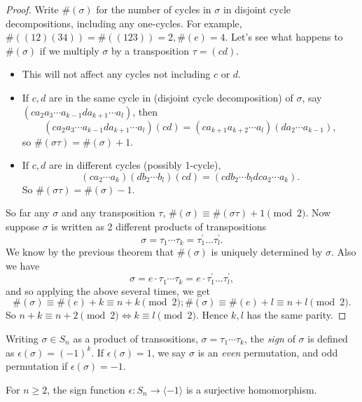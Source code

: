 \documentclass[10pt]{article}
\def\ge{\geqslant}
\begin{document}
    \begin{proof}
        Write $ \#(\sigma) $ for the number of cycles in $ \sigma $ in disjoint cycle decompositions, including any one-cycles. For example, $ \#((12)(34))=\#((123))=2, \#(e)=4 $. Let's see   what happens to $ \#(\sigma) $ if we multiply $ \sigma $ by a transposition $ \tau=(cd) $.
        \begin{itemize}[-]
            \item This will not affect any cycles not including $c$ or $d$.
            \item If $c,d$ are in the same cycle in (disjoint cycle decomposition) of $ \sigma$, say $ (c a_2 a_3 \cdots a_{k-1} d  a_{k+1} \cdots a_l) $, then 
            \[
                (c a_2 a_3 \cdots a_{k-1} d  a_{k+1} \cdots a_l)(cd)=(c a_{k+1} a_{k+2} \cdots a_l)(d a_2 \cdots a_{k-1})
            ,\]
            so $ \#(\sigma \tau) =\#(\sigma)+1$.
            \item If $c,d$ are in different cycles (possibly 1-cycle),
            \[
                (ca_2\cdots a_k)(db_2\cdots b_l)(cd)=(cdb_2\cdots b_ldca_2\cdots a_k)
            .\]
            So $ \# (\sigma\tau)=\#(\sigma)-1 $.
        \end{itemize}
        So far any $ \sigma $ and any transposition $ \tau $, $ \#(\sigma)\equiv\#(\sigma \tau)+1\pmod 2$. Now suppose $ \sigma $ is written as 2 different products of transpositions
        \[
            \sigma=\tau_{1} \cdots \tau_{k}=\tau_{1}^{\prime} \ldots \tau_{l}^{\prime}
        .\]
        We know by the previous theorem that $ \#(\sigma) $ is uniquely determined by $\sigma$. Also we have 
        \[
            \sigma=e\cdot \tau_{1} \cdots \tau_{k}= e\cdot \tau_{1}^{\prime} \ldots \tau_{l}^{\prime} 
        ,\]
        and so applying the above several times, we get 
        \[
            \#(\sigma)\equiv \#(e)+k\equiv n+k\pmod 2; \#(\sigma)\equiv \#(e)+l\equiv n+l\pmod 2
        .\]
        So $ n+k\equiv n+2\pmod 2 \Leftrightarrow k\equiv l\pmod 2 $. Hence $k,l$ has the same parity.
    \end{proof}
    \begin{definition}
        Writing $ \sigma\in S_n $ as a product of transositions, $ \sigma =\tau_{1} \cdots \tau_{k}$, the \textit{sign} of $ \sigma $ is defined as $ \epsilon(\sigma)=(-1)^k $. If $ \epsilon(\sigma)=1 $, we say $ \sigma $ is an \textit{even} permutation, and odd permutation if $ \epsilon(\sigma)=-1 $.
    \end{definition}
    \begin{theorem}\label{thm:2.19}
        For $ n\ge 2 $, the sign function $ \epsilon: S_n\to \langle -1 \rangle $ is a surjective homomorphism.
    \end{theorem}
\end{document}
